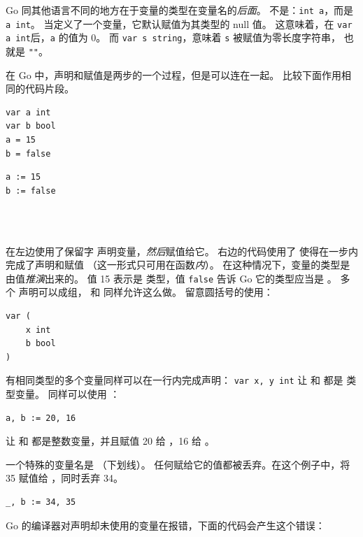 Go 同其他语言不同的地方在于变量的类型在变量名的\emph{后面}。
不是：\lstinline{int a}，而是 \lstinline{a int}。
当定义了一个变量，它默认赋值为其类型的 null 值。
这意味着，在 \lstinline{var a int}后，\lstinline{a} 的值为 0。
而 \lstinline{var s string}，意味着 \lstinline{s} 被赋值为零长度字符串，
也就是 \lstinline{""}。

在 Go 中，声明和赋值是两步的一个过程，但是可以连在一起。
比较下面作用相同的代码片段。

\begin{minipage}{.5\textwidth}
\begin{lstlisting}[linewidth=.5\textwidth,caption={Declaration with =}]
var a int
var b bool
a = 15
b = false
\end{lstlisting}
\hfill
\end{minipage}
\begin{minipage}{.5\textwidth}
\begin{lstlisting}[linewidth=.5\textwidth,caption={Declaration with :=}]
a := 15
b := false
\end{lstlisting}
\ \\
\ \\
\hfill
\end{minipage}

在左边使用了保留字  声明变量，\emph{然后}赋值给它。
右边的代码使用了 \mbox{\key{:=}{ }} 使得在一步内完成了声明和赋值
（这一形式只可用在函数\emph{内}）。
在这种情况下，变量的类型是由值\emph{推演}出来的。
值 15 表示是  类型，值 \texttt{false} 告诉 Go 它的类型应当是 。
多个  声明可以成组， 和  同样允许这么做。
留意圆括号的使用：
\begin{lstlisting}
var (
    x int
    b bool
)
\end{lstlisting}

有相同类型的多个变量同样可以在一行内完成声明：
\lstinline{var x, y int} 让  和  都是  类型变量。
同样可以使用 ：
\begin{lstlisting}
a, b := 20, 16
\end{lstlisting}
让  和  都是整数变量，并且赋值 20 给 ，16 给 。

一个特殊的变量名是 \var{\textbf{\_}} （下划线）。
任何赋给它的值都被丢弃。在这个例子中，将 35 赋值给 ，同时丢弃 34。
\begin{lstlisting}
_, b := 34, 35
\end{lstlisting}
Go 的编译器对声明却未使用的变量在报错，下面的代码会产生这个错误：

